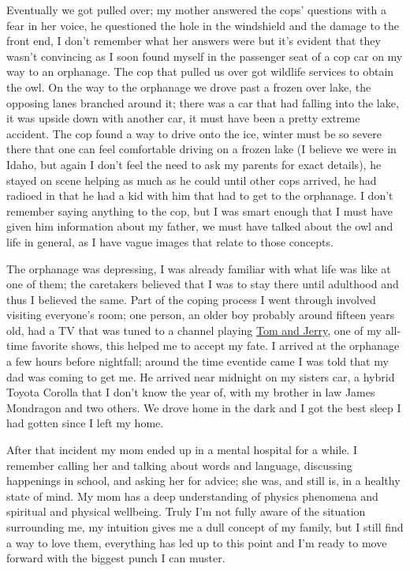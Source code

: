 \documentclass[12pt]{article}
\begin{document}
Eventually we got pulled over; my mother answered the cops' questions with
a fear in her voice, he questioned the hole in the windshield and the damage to
the front end, I don't remember what her answers were but it's evident that they
wasn't convincing as I soon found myself in the passenger seat of a cop car on
my way to an orphanage. The cop that pulled us over got wildlife services to
obtain the owl. On the way to the orphanage we drove past a frozen over lake,
the opposing lanes branched around it; there was a car that had falling into the
lake, it was upside down with another car, it must have been a pretty extreme
accident. The cop found a way to drive onto the ice, winter must be so severe
there that one can feel comfortable driving on a frozen lake (I believe we were
in Idaho, but again I don't feel the need to ask my parents for exact details),
he stayed on scene helping as much as he could until other cops arrived, he had
radioed in that he had a kid with him that had to get to the orphanage. I don't
remember saying anything to the cop, but I was smart enough that I must have
given him information about my father, we must have talked about the owl and
life in general, as I have vague images that relate to those concepts.

The orphanage was depressing, I was already familiar with what life was like at
one of them; the caretakers believed that I was to stay there until adulthood
and thus I believed the same. Part of the coping process I went through involved
visiting everyone's room; one person, an older boy probably around fifteen years
old, had a TV that was tuned to a channel playing
{\color{blue}\underline{\href{https://www.britannica.com/topic/Tom-and-Jerry}{Tom
and Jerry}}}, one of my all-time favorite shows, this helped me to accept my
fate. I arrived at the orphanage a few hours before nightfall; around the time
eventide came I was told that my dad was coming to get me. He arrived near
midnight on my sisters car, a hybrid Toyota Corolla that I don't know the year
of, with my brother in law James Mondragon and two others. We drove home in the
dark and I got the best sleep I had gotten since I left my home.

After that incident my mom ended up in a mental hospital for a while. I remember
calling her and talking about words and language, discussing happenings in
school, and asking her for advice; she was, and still is, in a healthy state of
mind. My mom has a deep understanding of physics phenomena and spiritual and
physical wellbeing. Truly I'm not fully aware of the situation surrounding me,
my intuition gives me a dull concept of my family, but I still find a way to
love them, everything has led up to this point and I'm ready to move forward
with the biggest punch I can muster.
\end{document}
